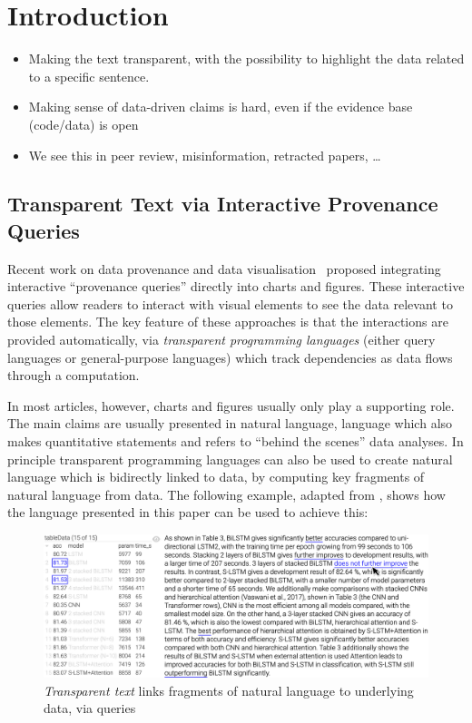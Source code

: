 \section{Introduction}

\begin{itemize}
    \item Making the text transparent, with the possibility to highlight the data related to a specific sentence.
    \item Making sense of data-driven claims is hard, even if the evidence base (code/data) is open
    \item We see this in peer review, misinformation, retracted papers, …
\end{itemize}


\subsection{Transparent Text via Interactive Provenance Queries}

Recent work on data provenance and data visualisation~\citep{psallidas18smoke,perera22,bond25} proposed
integrating interactive ``provenance queries'' directly into charts and figures. These interactive queries
allow readers to interact with visual elements to see the data relevant to those elements. The key feature of
these approaches is that the interactions are provided automatically, via \emph{transparent programming
languages} (either query languages or general-purpose languages) which track dependencies as data flows
through a computation.

In most articles, however, charts and figures usually only play a supporting role. The main claims are usually
presented in natural language, language which also makes quantitative statements and refers to ``behind the
scenes'' data analyses. In principle transparent programming languages can also be used to create natural
language which is bidirectly linked to data, by computing key fragments of natural language from data. The
following example, adapted from \cite{moosavi21}, shows how the language presented in this paper can be used
to achieve this:

\begin{figure}[h]
    \centering
    \includegraphics[width=\linewidth]{fig/scigen-1805.02474v1-10-with-pointer.png}
    \caption{\emph{Transparent text} links fragments of natural language to underlying data, via queries}\label{fig:scigen-example-website}
\end{figure}

